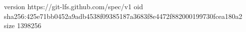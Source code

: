 version https://git-lfs.github.com/spec/v1
oid sha256:425e71bb0452a9adb4538f09385187a3683f8e4472f882000199730fcea180a2
size 1398256
